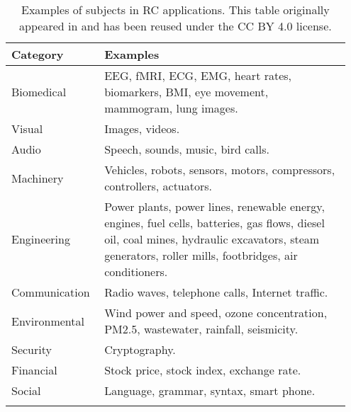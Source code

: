 \begin{table}[!ht]
    \raggedleft
    \caption[Examples of subjects in RC applications.]{Examples of subjects in RC applications. This table originally appeared in \citet{tanaka_recent_2019} and has been reused under the CC BY 4.0 license.}
    \begin{tabular}{p{0.25\linewidth}  p{0.7\linewidth}}
    \toprule
        \textbf{Category} & \textbf{Examples} \\ \midrule
        Biomedical & EEG, fMRI, ECG, EMG, heart rates, biomarkers, BMI, eye movement, mammogram, lung images. \\ 
        \arrayrulecolor{black!10!white}
        \midrule
        Visual & Images, videos. \\ 
        \midrule
        Audio & Speech, sounds, music, bird calls. \\ 
        \midrule
        Machinery & Vehicles, robots, sensors, motors, compressors,  controllers, actuators. \\ 
        \midrule
        Engineering & Power plants, power lines, renewable energy, engines, fuel cells, batteries, gas flows, diesel oil, coal mines, hydraulic excavators, steam generators, roller mills, footbridges, air conditioners. \\ 
        \midrule
        Communication & Radio waves, telephone calls, Internet traffic. \\ 
        \midrule
        Environmental & Wind power and speed, ozone concentration, PM2.5, wastewater, rainfall, seismicity. \\ 
        \midrule
        Security & Cryptography. \\ 
        \midrule
        Financial & Stock price, stock index, exchange rate. \\ 
        \midrule
        Social & Language, grammar, syntax, smart phone. \\ 
    \arrayrulecolor{black}
    \bottomrule
    \end{tabular}
    \label{table:rc-subjects}
\end{table}


